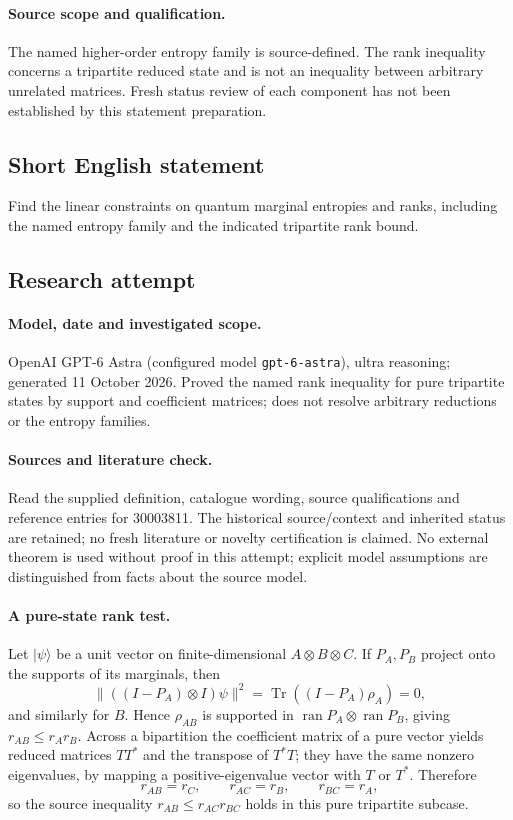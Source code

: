 \documentclass[11pt]{article}
\begin{document}
\paragraph{Source scope and qualification.}
The named higher-order entropy family is source-defined. The rank inequality concerns a tripartite reduced state and is not an inequality between arbitrary unrelated matrices. Fresh status review of each component has not been established by this statement preparation.
\subsection{Short English statement}
Find the linear constraints on quantum marginal entropies and ranks, including the named entropy family and the indicated tripartite rank bound.
\subsection{Research attempt}
\paragraph{Model, date and investigated scope.}
OpenAI GPT-6 Astra (configured model \texttt{gpt-6-astra}), ultra reasoning; generated 11 October 2026. Proved the named rank inequality for pure tripartite states by support and coefficient matrices; does not resolve arbitrary reductions or the entropy families.

\paragraph{Sources and literature check.}
Read the supplied definition, catalogue wording, source qualifications and reference entries for 30003811. The historical source/context and inherited status are retained; no fresh literature or novelty certification is claimed. No external theorem is used without proof in this attempt; explicit model assumptions are distinguished from facts about the source model.

\paragraph{A pure-state rank test.} Let \(|\psi\rangle\) be a unit vector on finite-dimensional \(A\otimes B\otimes C\). If \(P_A,P_B\) project onto the supports of its marginals, then
\[
 \|((I-P_A)\otimes I)\psi\|^2=\operatorname{Tr}((I-P_A)\rho_A)=0,
\]
and similarly for \(B\). Hence \(\rho_{AB}\) is supported in \(\operatorname{ran}P_A\otimes\operatorname{ran}P_B\), giving \(r_{AB}\le r_A r_B\). Across a bipartition the coefficient matrix of a pure vector yields reduced matrices \(TT^*\) and the transpose of \(T^*T\); they have the same nonzero eigenvalues, by mapping a positive-eigenvalue vector with \(T\) or \(T^*\). Therefore
\[
 r_{AB}=r_C,\qquad r_{AC}=r_B,\qquad r_{BC}=r_A,
\]
so the source inequality \(r_{AB}\le r_{AC}r_{BC}\) holds in this pure tripartite subcase.
\end{document}
